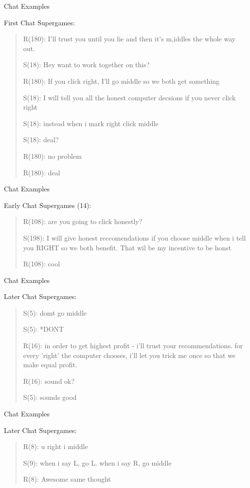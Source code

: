 \documentclass{beamer}
\begin{document}
\begin{frame}{Chat Examples}

First Chat Supergames:
\begin{quotation}
R(180): I'll trust you until you lie and then it's m,iddles the whole
way out. 

S(18): Hey want to work together on this? 

R(180): If you click right, I'll go middle so we both get something 

S(18): I will tell you all the honest computer decsions if you never
click right 

S(18): instead when i mark right click middle 

S(18): deal? 

R(180): no problem 

R(180): deal
\end{quotation}
\end{frame}

\begin{frame}{Chat Examples}

Early Chat Supergames (14):
\begin{quotation}
R(108): are you going to click honestly? 

S(198): I will give honest reccomendations if you choose middle when
i tell you RIGHT so we both benefit. That wil be my incentive to be
honst 

R(108): cool
\end{quotation}
\end{frame}

\begin{frame}{Chat Examples}

Later Chat Supergames:
\begin{quotation}
S(5): domt go middle 

S(5): {*}DONT 

R(16): in order to get highest profit - i'll trust your recommendations.
for every 'right' the computer chooses, i'll let you trick me once
so that we make equal profit. 

R(16): sound ok? 

S(5): sounds good
\end{quotation}
\end{frame}

\begin{frame}{Chat Examples}

Later Chat Supergames:
\begin{quotation}
R(8): u right i middle 

S(9): when i say L, go L. when i say R, go middle 

R(8): Awesome same thought 
\end{quotation}
\end{frame}
\end{document}
